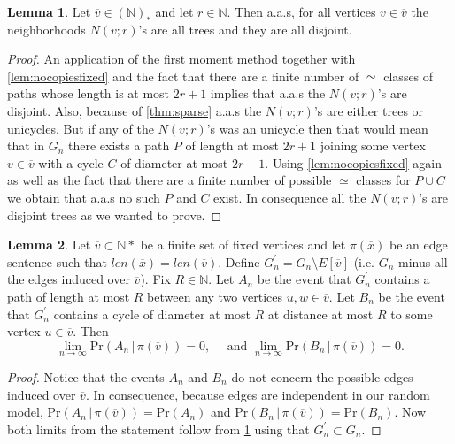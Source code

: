 \documentclass[12pt,notitlepage,a4paper]{article}
\theoremstyle{definition}
\newtheorem{lemma}{Lemma}[section]
\newcommand{\N}{\mathbb{N}}
\newcommand{\Ln}{\lim\limits_{n\to \infty}}
\begin{document}
\begin{lemma} \label{lem:disjointtrees}
	Let $\overline{v}\in (\N)_*$ and let $r\in \N$. Then
	a.a.s, for all vertices $v\in \overline{v}$ the neighborhoods 
	$N(v;r)$'s are all trees and they are all disjoint. 
	
	\begin{proof}
		An application of the first moment method together with
		\cref{lem:nocopiesfixed} and the fact that there are a finite number
		of $\simeq$ classes of paths whose length is at most $2r+1$ implies that
		a.a.s the $N(v;r)$'s are disjoint. 
		Also, because of \cref{thm:sparse} a.a.s the $N(v;r)$'s are either 
		trees or unicycles. But if any of the $N(v;r)$'s was an unicycle then
		that would mean that in $G_n$ there exists a path $P$ of length at most
		$2r+1$ joining some vertex $v\in \overline{v}$
		with a cycle $C$ of diameter at most $2r+1$. Using \cref{lem:nocopiesfixed}
		again as well as the fact that there are a finite number of possible $\simeq$
		classes for
		$P\cup C$ we obtain that a.a.s no such $P$ and $C$ exist. 
		In consequence all the $N(v;r)$'s are disjoint trees as we wanted to
		prove. \end{proof}
\end{lemma}

\begin{lemma}\label{lem:far_away}
	Let $\overline{v} \subset \N*$ be a finite set of fixed vertices and let 
	$\pi(\overline{x})$ be an edge sentence such that
	$len(\overline{x})=len(\overline{v})$. 
	Define $G_n^\prime=G_n \setminus E[\overline{v}]$ (i.e. $G_n$ minus all the
	edges induced over $\overline{v}$). Fix $R\in \N$. 
	Let $A_n$ be the event that $G^\prime_n$ contains a path of 
	length	at most	$R$ between any two vertices $u,w\in \overline{v}$.
	Let $B_n$ be the event
	that $G^\prime_n$ contains a cycle of diameter at most $R$
	at distance at most $R$ to some vertex $u\in \overline{v}$.
	Then 
	\[
	\Ln \mathrm{Pr}\left(A_n \, | \, \pi(\overline{v})\right)=0, \quad 
	\text{ and } 
	\Ln \mathrm{Pr}\left(B_n \, | \, \pi(\overline{v})\right)=0.\] 
\end{lemma}
\begin{proof}
	Notice that the events $A_n$ and $B_n$ do not concern the possible edges
	induced over $\overline{v}$. In consequence, because edges are independent
	in our random model, 
	$\mathrm{Pr}\left(A_n \, | \, \pi(\overline{v})\right)
	=\mathrm{Pr}(A_n)$ and 
	$\mathrm{Pr}\left(B_n \, | \, \pi(\overline{v})\right)
	=\mathrm{Pr}(B_n)$. Now
	both limits from the statement follow from 
	\cref{lem:disjointtrees} using that $G^\prime_n\subset G_n$.  
\end{proof}
\end{document}
